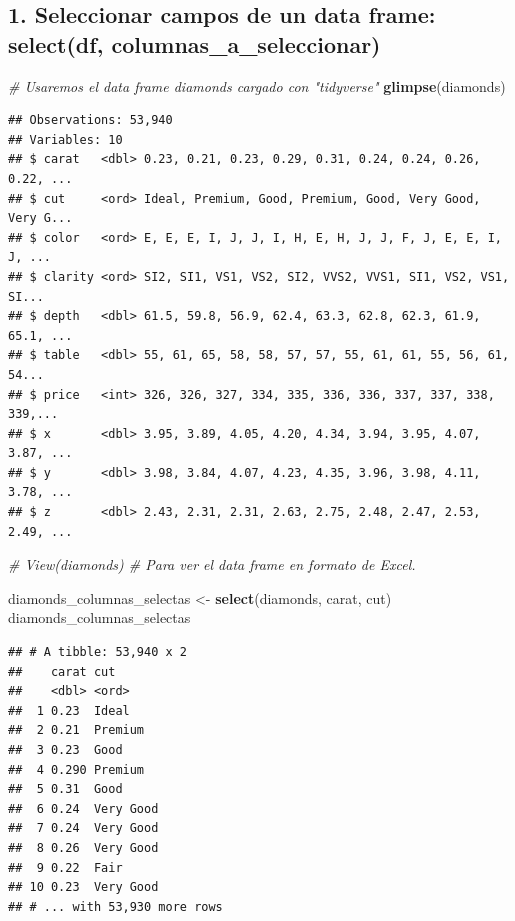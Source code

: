 \documentclass[]{book}
\newenvironment{Shaded}{\begin{snugshade}}{\end{snugshade}}
\newcommand{\KeywordTok}[1]{\textcolor[rgb]{0.13,0.29,0.53}{\textbf{#1}}}
\newcommand{\StringTok}[1]{\textcolor[rgb]{0.31,0.60,0.02}{#1}}
\newcommand{\CommentTok}[1]{\textcolor[rgb]{0.56,0.35,0.01}{\textit{#1}}}
\newcommand{\NormalTok}[1]{#1}
\theoremstyle{definition}
\theoremstyle{definition}
\theoremstyle{definition}
\theoremstyle{remark}
\begin{document}
\subsection{1. Seleccionar campos de un data frame: select(df,
columnas\_a\_seleccionar)}\label{seleccionar-campos-de-un-data-frame-selectdf-columnas_a_seleccionar}

\begin{Shaded}
\begin{Highlighting}[]
\CommentTok{# Usaremos el data frame diamonds cargado con "tidyverse"}
\KeywordTok{glimpse}\NormalTok{(diamonds)}
\end{Highlighting}
\end{Shaded}

\begin{verbatim}
## Observations: 53,940
## Variables: 10
## $ carat   <dbl> 0.23, 0.21, 0.23, 0.29, 0.31, 0.24, 0.24, 0.26, 0.22, ...
## $ cut     <ord> Ideal, Premium, Good, Premium, Good, Very Good, Very G...
## $ color   <ord> E, E, E, I, J, J, I, H, E, H, J, J, F, J, E, E, I, J, ...
## $ clarity <ord> SI2, SI1, VS1, VS2, SI2, VVS2, VVS1, SI1, VS2, VS1, SI...
## $ depth   <dbl> 61.5, 59.8, 56.9, 62.4, 63.3, 62.8, 62.3, 61.9, 65.1, ...
## $ table   <dbl> 55, 61, 65, 58, 58, 57, 57, 55, 61, 61, 55, 56, 61, 54...
## $ price   <int> 326, 326, 327, 334, 335, 336, 336, 337, 337, 338, 339,...
## $ x       <dbl> 3.95, 3.89, 4.05, 4.20, 4.34, 3.94, 3.95, 4.07, 3.87, ...
## $ y       <dbl> 3.98, 3.84, 4.07, 4.23, 4.35, 3.96, 3.98, 4.11, 3.78, ...
## $ z       <dbl> 2.43, 2.31, 2.31, 2.63, 2.75, 2.48, 2.47, 2.53, 2.49, ...
\end{verbatim}

\begin{Shaded}
\begin{Highlighting}[]
\CommentTok{# View(diamonds) # Para ver el data frame en formato de Excel.}

\NormalTok{diamonds_columnas_selectas <-}\StringTok{ }\KeywordTok{select}\NormalTok{(diamonds, carat, cut)}
\NormalTok{diamonds_columnas_selectas}
\end{Highlighting}
\end{Shaded}

\begin{verbatim}
## # A tibble: 53,940 x 2
##    carat cut      
##    <dbl> <ord>    
##  1 0.23  Ideal    
##  2 0.21  Premium  
##  3 0.23  Good     
##  4 0.290 Premium  
##  5 0.31  Good     
##  6 0.24  Very Good
##  7 0.24  Very Good
##  8 0.26  Very Good
##  9 0.22  Fair     
## 10 0.23  Very Good
## # ... with 53,930 more rows
\end{verbatim}
\end{document}
